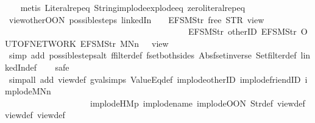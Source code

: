 \begin{isabellebody}
%
\isadelimproof
\ \ %
\endisadelimproof
%
\isatagproof
{}\isamarkupfalse%
\ {\isacharparenleft}metis\ Literal{\isachardot}rep{\isacharunderscore}eq\ String{\isachardot}implode{\isacharunderscore}explode{\isacharunderscore}eq\ zero{\isacharunderscore}literal{\isachardot}rep{\isacharunderscore}eq{\isacharparenright}%
\endisatagproof
{\isafoldproof}%
%
\isadelimproof
\isanewline
%
\endisadelimproof
\isanewline
{}\isamarkupfalse%
\ view{\isacharunderscore}other{\isacharunderscore}OON{\isacharcolon}\ {\isachardoublequoteopen}possible{\isacharunderscore}steps\ linkedIn\ {}\ {\isacharless}{}\ {\isacharcolon}{\isacharequal}\ EFSM{\isachardot}Str\ {\isacharprime}{\isacharprime}free{\isacharprime}{\isacharprime}{\isachargreater}\ STR\ {\isacharprime}{\isacharprime}view{\isacharprime}{\isacharprime}\isanewline
\ \ \ \ \ \ \ \ \ \ \ \ \ \ \ \ \ \ \ \ \ \ \ \ \ \ \ \ \ \ \ \ \ \ \ \ \ \ \ \ \ \ \ {\isacharbrackleft}EFSM{\isachardot}Str\ {\isacharprime}{\isacharprime}otherID{\isacharprime}{\isacharprime}{\isacharcomma}\ EFSM{\isachardot}Str\ {\isacharprime}{\isacharprime}OUT{\isacharunderscore}OF{\isacharunderscore}NETWORK{\isacharprime}{\isacharprime}{\isacharcomma}\ EFSM{\isachardot}Str\ {\isacharprime}{\isacharprime}MNn{}{\isacharprime}{\isacharprime}{\isacharbrackright}\ {\isacharequal}\ {\isacharbraceleft}{\isacharbar}{\isacharparenleft}{}{\isacharcomma}\ view{}{\isacharparenright}{\isacharbar}{\isacharbraceright}{\isachardoublequoteclose}\isanewline
%
\isadelimproof
\ \ %
\endisadelimproof
%
\isatagproof
{}\isamarkupfalse%
\ {\isacharparenleft}simp\ add{\isacharcolon}\ possible{\isacharunderscore}steps{\isacharunderscore}alt\ ffilter{\isacharunderscore}def\ fset{\isacharunderscore}both{\isacharunderscore}sides\ Abs{\isacharunderscore}fset{\isacharunderscore}inverse\ Set{\isachardot}filter{\isacharunderscore}def\ linkedIn{\isacharunderscore}def{\isacharparenright}\isanewline
\ \ \isamarkupfalse%
\ safe\isanewline
\ \ \isamarkupfalse%
\ {\isacharparenleft}simp{\isacharunderscore}all\ add{\isacharcolon}\ view{\isacharunderscore}def\ gval{\isachardot}simps\ ValueEq{\isacharunderscore}def\ implode{\isacharunderscore}otherID\ implode{\isacharunderscore}friendID\ implode{\isacharunderscore}MNn{}\ \isanewline
\ \ \ \ \ \ \ \ \ \ \ \ \ \ \ \ \ \ \ \ implode{\isacharunderscore}HM{}p\ implode{\isacharunderscore}name\ implode{\isacharunderscore}OON\ Str{\isacharunderscore}def\ view{}{\isacharunderscore}def\ view{}{\isacharunderscore}def\ view{}{\isacharunderscore}def\isanewline

\end{isabellebody}
